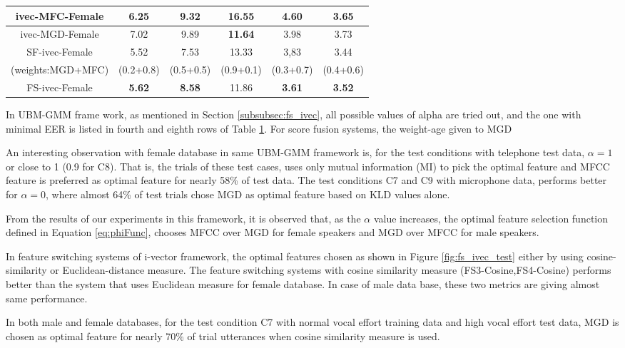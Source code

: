 \documentclass{article}
\begin{document}
\begin{table}[t]
\begin{tabular}{|c|c|c|c|c|c|}
{ivec-MFC-Female} & 6.25 & 9.32 & 16.55 & 4.60 & 3.65 \\ \hline

{ivec-MGD-Female} & 7.02 & 9.89 & {\bf 11.64} & 3.98 & 3.73 \\ \hline 

SF-ivec-Female & 5.52 & 7.53 & 13.33 & 3,83 & 3.44 \\ 
(weights:MGD+MFC) & (0.2+0.8) & (0.5+0.5) & (0.9+0.1) & (0.3+0.7) & (0.4+0.6) \\ \hline

{FS-ivec-Female} & {\bf 5.62} & {\bf 8.58} & 11.86 & {\bf 3.61} & {\bf 3.52} \\ \hline

	\end{tabular}
	\label{tab:eer}
	\end{table}

In UBM-GMM frame work, as mentioned in Section \ref{subsubsec:fs_ivec}, all possible values of alpha are tried out, and the one with minimal EER is listed in fourth and eighth rows of Table \ref{tab:eer}.  For score fusion systems, the weight-age given to MGD



\vspace{0.25cm}

An interesting observation with female database in same UBM-GMM framework is, for the test conditions with telephone test data, $\alpha=1$ or close to 1  (0.9 for C8). That is, the trials of these test cases, uses only mutual information (MI) to pick the optimal feature and MFCC feature is preferred as optimal feature for nearly 58\% of test data. The test conditions C7 and C9 with microphone data, performs better for $\alpha=0$, where almost 64\% of test trials chose MGD as optimal feature based on KLD values alone.

\vspace{0.25cm}
From the results of our experiments in this framework, it is observed that, as the $\alpha$ value increases, the optimal feature selection function defined in Equation \ref{eq:phiFunc}, chooses MFCC over MGD for female speakers and MGD over MFCC for male speakers.

\vspace{0.25cm}

In feature switching systems of i-vector framework, the optimal features chosen as shown in Figure \ref{fig:fs_ivec_test} either by using cosine-similarity  or Euclidean-distance measure. The feature switching systems with cosine similarity measure  (FS3-Cosine,FS4-Cosine) performs better than the system that uses Euclidean measure for female database. In case of male data base, these two metrics are giving almost same performance. 

\vspace{0.25cm}
In both male and female databases, for the test condition C7 with normal vocal effort training data and high vocal effort test data, MGD is chosen as optimal feature for nearly 70\% of trial utterances when cosine similarity measure is used. 





\end{document}
